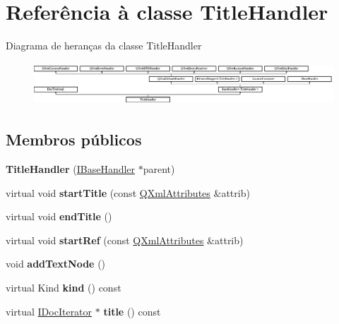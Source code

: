 \hypertarget{class_title_handler}{\section{Referência à classe Title\-Handler}
\label{class_title_handler}
}
Diagrama de heranças da classe Title\-Handler\begin{figure}[H]
\begin{center}
\leavevmode
\includegraphics[height=1.600000cm]{class_title_handler}
\end{center}
\end{figure}
\subsection*{Membros públicos}
\begin{DoxyCompactItemize}
\item 
\hypertarget{class_title_handler_a74e8ee2cfd61e9cdf3c638814015bfe9}{{\bfseries Title\-Handler} (\hyperlink{class_i_base_handler}{I\-Base\-Handler} $\ast$parent)}\label{class_title_handler_a74e8ee2cfd61e9cdf3c638814015bfe9}

\item 
\hypertarget{class_title_handler_a542aae01d1b2fae60d3c4dd0b77f6669}{virtual void {\bfseries start\-Title} (const \hyperlink{class_q_xml_attributes}{Q\-Xml\-Attributes} \&attrib)}\label{class_title_handler_a542aae01d1b2fae60d3c4dd0b77f6669}

\item 
\hypertarget{class_title_handler_a7b02cc485cad21197a018533aa05fe79}{virtual void {\bfseries end\-Title} ()}\label{class_title_handler_a7b02cc485cad21197a018533aa05fe79}

\item 
\hypertarget{class_title_handler_a64b60752227d7af719398c2683cb17bf}{virtual void {\bfseries start\-Ref} (const \hyperlink{class_q_xml_attributes}{Q\-Xml\-Attributes} \&attrib)}\label{class_title_handler_a64b60752227d7af719398c2683cb17bf}

\item 
\hypertarget{class_title_handler_a47a58db8eb38a68e8bec03787c4c1763}{void {\bfseries add\-Text\-Node} ()}\label{class_title_handler_a47a58db8eb38a68e8bec03787c4c1763}

\item 
\hypertarget{class_title_handler_af8e62c8a81ddf2283205cc8955de50eb}{virtual Kind {\bfseries kind} () const }\label{class_title_handler_af8e62c8a81ddf2283205cc8955de50eb}

\item 
\hypertarget{class_title_handler_a19904cae9629e423ffecbd837b5f9f87}{virtual \hyperlink{class_i_doc_iterator}{I\-Doc\-Iterator} $\ast$ {\bfseries title} () const }\label{class_title_handler_a19904cae9629e423ffecbd837b5f9f87}

\end{DoxyCompactItemize}
